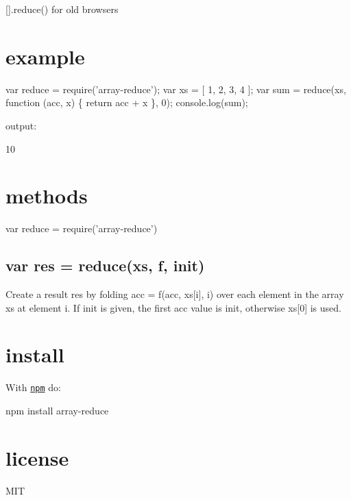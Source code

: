 {\ttfamily \mbox{[}\mbox{]}.reduce()} for old browsers

\href{https://ci.testling.com/substack/array-reduce}{\tt }

\href{http://travis-ci.org/substack/array-reduce}{\tt }

\section*{example}


\begin{DoxyCode}
var reduce = require('array-reduce');
var xs = [ 1, 2, 3, 4 ];
var sum = reduce(xs, function (acc, x) \{ return acc + x \}, 0);
console.log(sum);
\end{DoxyCode}


output\+:


\begin{DoxyCode}
10
\end{DoxyCode}


\section*{methods}


\begin{DoxyCode}
var reduce = require('array-reduce')
\end{DoxyCode}


\subsection*{var res = reduce(xs, f, init)}

Create a result {\ttfamily res} by folding {\ttfamily acc = f(acc, xs\mbox{[}i\mbox{]}, i)} over each element in the array {\ttfamily xs} at element {\ttfamily i}. If {\ttfamily init} is given, the first {\ttfamily acc} value is {\ttfamily init}, otherwise {\ttfamily xs\mbox{[}0\mbox{]}} is used.

\section*{install}

With \href{https://npmjs.org}{\tt npm} do\+:


\begin{DoxyCode}
npm install array-reduce
\end{DoxyCode}


\section*{license}

M\+IT 